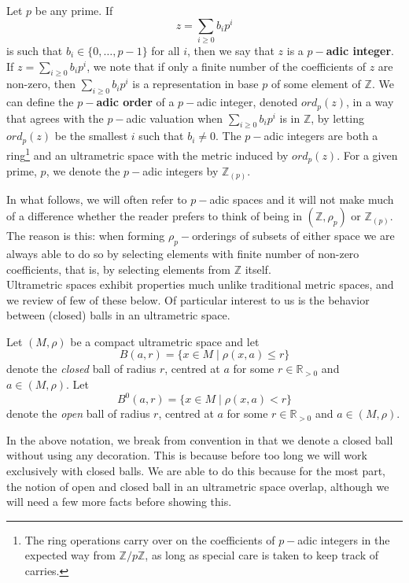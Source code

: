 \begin{example}
Let $p$ be any prime. If 
\[z = \sum_{i \geq 0} b_ip^i\]
is such that $b_i \in \{0,\ldots,p-1\}$ for all $i$, then we say that $z$ is a \textbf{$p-$adic integer}. If $z = \sum_{i \geq 0} b_ip^i$, we note that if only a finite number of the coefficients of $z$ are non-zero, then $\sum_{i \geq 0} b_ip^i$ is a representation in base $p$ of some element of $\mathbb{Z}$. We can define the \textbf{$p-$adic order} of a $p-$adic integer, denoted $ord_p(z)$, in a way that agrees with the $p-$adic valuation when $\sum_{i \geq 0} b_ip^i$ is in $\mathbb{Z}$, by letting $ord_p(z)$ be the smallest $i$ such that $b_i \neq 0$. The $p-$adic integers are both a ring\footnote{The ring operations carry over on the coefficients of $p-$adic integers in the expected way from $\mathbb{Z}/p\mathbb{Z}$, as long as special care is taken to keep track of carries.} and an ultrametric space with the metric induced by $ord_p(z)$. For a given prime, $p$, we denote the $p-$adic integers by $\mathbb{Z}_{(p)}$.
\end{example} 

In what follows, we will often refer to $p-$adic spaces and it will not make much of a difference whether the reader prefers to think of being in $(\mathbb{Z}, \rho_p)$ or $\mathbb{Z}_{(p)}$. The reason is this: when forming $\rho_p-$orderings of subsets of either space we are always able to do so by selecting elements with finite number of non-zero coefficients, that is, by selecting elements from $\mathbb{Z}$ itself. \\

Ultrametric spaces exhibit properties much unlike traditional metric spaces, and we review of few of these below. Of particular interest to us is the behavior between (closed) balls in an ultrametric space. \\

\begin{notation*}
	Let $(M, \rho)$ be a compact ultrametric space and let \[B(a, r)=\{x \in M \mid \rho(x,a) \leq r\}\] denote the \textit{closed} ball of radius $r$, centred at $a$ for some $r \in \mathbb{R}_{> 0}$ and $a \in (M,\rho)$. Let \[B^0(a, r)=\{x \in M \mid \rho(x,a) < r\}\] denote the \textit{open} ball of radius $r$, centred at $a$ for some $r \in \mathbb{R}_{> 0}$ and $a \in (M,\rho)$.
\end{notation*} 


In the above notation, we break from  convention in that we denote a closed ball without using any decoration. This is because before too long we will work exclusively with closed balls.  We are able to do this because for the most part, the notion of open and closed ball in an ultrametric space overlap, although we will need a few more facts before showing this.\\

